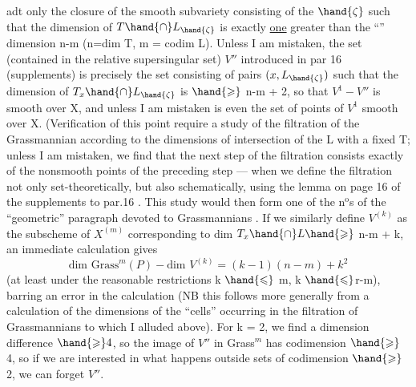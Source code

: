
adt only the closure of the smooth subvariety consisting of the $\hand{\zeta}$ such that
the dimension of $T\hand{\cap}L_{\hand{\zeta}}$ is exactly \uline{one} greater than the
“” dimension n-m (n=dim T, m = codim L). Unless I am mistaken, the set
(contained in the relative supersingular set) $V''$ introduced in par
16 (supplements) is precisely the set consisting of pairs
$(x,L_{\hand{\zeta}})$ such that the dimension of $T_x\hand{\cap}L_{\hand{\zeta}}$ is $\hand{\geqslant}$ n-m + 2\hand{)}, so that
 $V^1 - V''$ is  smooth over X, and unless I am mistaken is even  the set
of points of $V^1$ smooth over X. (Verification of this point 
require a study of the filtration of the  Grassmannian  according to the 
dimensions of intersection of the  L with a fixed T; unless I am mistaken,
we find that the next step of the filtration consists exactly of
the nonsmooth points of the preceding step --- when we define the filtration
 not only set-theoretically, but also schematically, using
the lemma on page 16 of the supplements to par.16 \hand{\unsure{)|\S}}. This study would then
form one of the n$^{\text{o}}$s of the “geometric” paragraph devoted to Grassmannians
\hand{)}. If we similarly define  $V^{(k)}$ as the subscheme of $X^{(m)}$
corresponding to dim $T_x\hand{\cap}L \hand{\geqslant}$ n-m + k, an immediate calculation gives
\[ \text{dim Grass}^m(P) - \text{dim } V^{(k)} = (k-1)(n-m) + k^2 \]
(at least under the reasonable restrictions k $\hand{\leqslant}$ m, k $\hand{\leqslant}$r-m), barring
an error in the calculation (NB this follows more generally from a calculation of
the dimensions of the “cells” occurring in the filtration of Grassmannians
to which I alluded above). For k = 2, we
find a dimension difference $\hand{\geqslant} 4$, so the image of $V''$ in Grass$^m$
has codimension $\hand{\geqslant}$ 4, so if we are interested in what happens outside
sets  of codimension $\hand{\geqslant}$ 2, we can  forget $V''$.

